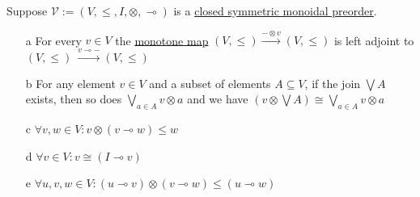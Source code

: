Suppose $\mathcal{V}:=(V,\leq,I,\otimes,\multimap)$ is a \href{doc/1 math/Seven Sketches in Compositionality/Chapter 2: Resource theories/5 Computing presented V-categories with matrix mult/1 Monoidal closed preorders/1 Closed SMP}{closed symmetric monoidal preorder}.
    \begin{itemize}
      \item[a] For every $v \in V$ the \href{doc/1 math/Seven Sketches in Compositionality/Chapter 1: Generative Effects/4 Monotone maps/1 Monotone map}{monotone map} $(V, \leq) \xrightarrow{-\otimes v}(V,\leq)$ is left adjoint to $(V, \leq)\ \xrightarrow{v \multimap -} (V,\leq)$
      \item[b]For any element $v \in V$ and a subset of elements $A \subseteq V$, if the join $\bigvee A$ exists, then so does $\bigvee_{a \in A} v \otimes a$ and we have $(v \otimes \bigvee A)\cong  \bigvee_{a \in A} v \otimes a$
      \item[c]$\forall v,w \in V: v \otimes (v \multimap w) \leq w$
      \item[d]$\forall v \in V: v \cong (I \multimap v)$
      \item[e]$\forall u,v,w \in V: (u \multimap v) \otimes (v \multimap w) \leq (u \multimap w)$
    \end{itemize}